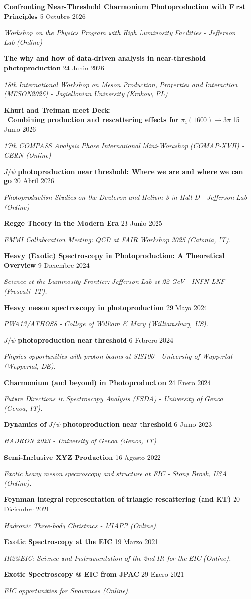 \documentclass[letterpaper,11pt]{article}
\newcommand{\entrymid}[4][]{
    \item[#1] \small{#2} \hfill \small{#3}
    \vspace{-\smallskipamount} \item[]\small{\textit{#4}}}
\begin{document}
{
    \entrymid[\textbullet]
    {\textbf{Confronting Near-Threshold Charmonium Photoproduction with First Principles}}{5 Octubre 2026}{Workshop on the Physics Program with High Luminosity Facilities - Jefferson Lab (Online)
    }
    \entrymid[\textbullet]
    {\textbf{The why and how of data-driven analysis in near-threshold photoproduction }}{24 Junio 2026}{18th International Workshop on Meson Production, Properties and Interaction (MESON2026) - Jagiellonian University (Krakow, PL)   
    }

    \entrymid[\textbullet]
    {\textbf{ Khuri and Treiman meet Deck: \\
    \, Combining production and rescattering effects for} $\pi_1(1600) \to 3\pi$}{15 Junio 2026}{17th COMPASS Analysis Phase International Mini-Workshop (COMAP-XVII) - CERN (Online)   
    }

    \entrymid[\textbullet]
    {\textbf{$J/\psi$ photoproduction near threshold: Where we are and where we can go}}{20 Abril 2026}{Photoproduction Studies on the Deuteron and Helium-3 in Hall D - Jefferson Lab (Online)   
    }

    \entrymid[\textbullet]
    {\textbf{Regge Theory in the Modern Era
    }}{23 Junio 2025}{EMMI Collaboration Meeting: QCD at FAIR Workshop 2025 (Catania, IT). 
    }

    \entrymid[\textbullet]
    {\textbf{Heavy (Exotic) Spectroscopy in Photoproduction: A Theoretical Overview
    }}{9 Diciembre 2024}{Science at the Luminosity Frontier: Jefferson Lab at 22 GeV - INFN-LNF (Frascati, IT). 
    }

    \entrymid[\textbullet]
    {\textbf{Heavy meson spectroscopy in photoproduction}}{29 Mayo 2024}{PWA13/ATHOS8 - College of William \& Mary (Williamsburg, US). 
    }

    \entrymid[\textbullet]
    {\textbf{$J/\psi$ photoproduction near threshold}}{6 Febrero 2024}{Physics opportunities with proton beams at SIS100 - University of Wuppertal (Wuppertal, DE). 
    }

    \entrymid[\textbullet]
    {\textbf{Charmonium (and beyond) in Photoproduction}}{24 Enero 2024}{Future Directions in Spectroscopy Analysis (FSDA) - University of Genoa (Genoa, IT). 
    }

    \entrymid[\textbullet]
    {\textbf{Dynamics of $J/\psi$ photoproduction near threshold}}{6 Junio 2023}{HADRON 2023 - University of Genoa (Genoa, IT). 
    }

    \entrymid[\textbullet]
    {\textbf{Semi-Inclusive XYZ Production}}{16 Agosto 2022}{Exotic heavy meson spectroscopy and structure at EIC - Stony Brook, USA (Online). 
    }

    \entrymid[\textbullet]
    {\textbf{Feynman integral representation of triangle rescattering (and KT)
    }}{20 Diciembre 2021}{Hadronic Three-body Christmas
    - MIAPP (Online).
    }

    \entrymid[\textbullet]
    {\textbf{Exotic Spectroscopy at the EIC}}{19 Marzo 2021}{IR2@EIC: Science and Instrumentation of the 2nd IR for the EIC (Online).
    }

    \entrymid[\textbullet]
    {\textbf{Exotic Spectroscopy @ EIC from JPAC}}{29 Enero 2021}{EIC opportunities for Snowmass (Online).
    }
}
\end{document}
